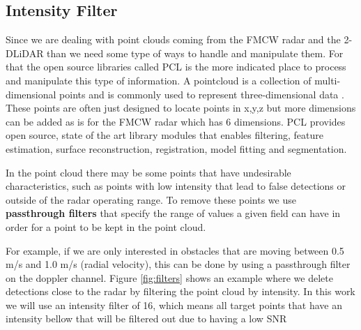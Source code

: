 \subsection{Intensity Filter}
Since we are dealing with point clouds coming from the \ac{FMCW} \ac{radar} and the 2-D\ac{LiDAR} than we need some type of ways to handle and manipulate them. For that the open source libraries called \ac{PCL} is the more indicated place to process and manipulate this type of information. A pointcloud is a collection of multi-dimensional points and is commonly used to represent three-dimensional data \cite{pcl}. These points are often just designed to locate points in x,y,z but more dimensions can be added as is for the FMCW radar which has 6 dimensions. \ac{PCL} provides open source, state of the art library modules that enables  filtering, feature estimation, surface reconstruction, registration, model fitting and segmentation. 

In the point cloud there may be some points that have undesirable characteristics, such as points with low intensity  that lead to false detections or outside of the radar operating range. To remove these points we use \textbf{passthrough filters} that specify the range of values a given field can have in order for a point to be kept in the point cloud. 

For example, if we are only interested in obstacles that are moving between 0.5 m/s and 1.0 m/s (radial velocity), this can be done by using a passthrough filter on the doppler channel.
Figure \ref{fig:filters} shows an example where we delete detections close to the radar by filtering the point cloud by intensity. In this work we will use an intensity filter of 16, which means all target points that have an intensity bellow that will be filtered out due to having a low \ac{SNR}


